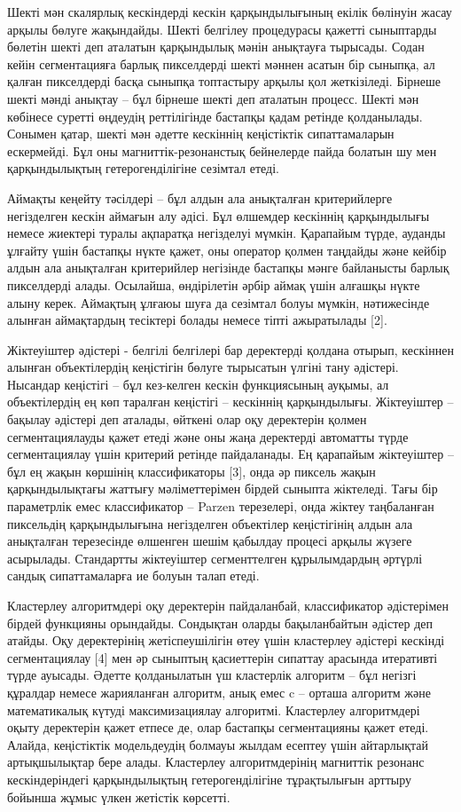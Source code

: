 Шекті мән скалярлық кескіндерді кескін қарқындылығының екілік бөлінуін
жасау арқылы бөлуге жақындайды. Шекті белгілеу процедурасы қажетті
сыныптарды бөлетін шекті деп аталатын қарқындылық мәнін анықтауға
тырысады. Содан кейін сегментацияға барлық пикселдерді шекті мәннен
асатын бір сыныпқа, ал қалған пикселдерді басқа сыныпқа топтастыру
арқылы қол жеткізіледі. Бірнеше шекті мәнді анықтау -- бұл бірнеше шекті
деп аталатын процесс. Шекті мән көбінесе суретті өңдеудің реттілігінде
бастапқы қадам ретінде қолданылады. Сонымен қатар, шекті мән әдетте
кескіннің кеңістіктік сипаттамаларын ескермейді. Бұл оны
магниттік-резонанстық бейнелерде пайда болатын шу мен қарқындылықтың
гетерогенділігіне сезімтал етеді.

Аймақты кеңейту тәсілдері -- бұл алдын ала анықталған критерийлерге
негізделген кескін аймағын алу әдісі. Бұл өлшемдер кескіннің
қарқындылығы немесе жиектері туралы ақпаратқа негізделуі мүмкін.
Қарапайым түрде, ауданды ұлғайту үшін бастапқы нүкте қажет, оны оператор
қолмен таңдайды және кейбір алдын ала анықталған критерийлер негізінде
бастапқы мәнге байланысты барлық пикселдерді алады. Осылайша,
өндірілетін әрбір аймақ үшін алғашқы нүкте алыну керек. Аймақтың ұлғаюы
шуға да сезімтал болуы мүмкін, нәтижесінде алынған аймақтардың тесіктері
болады немесе тіпті ажыратылады {[}2{]}.

Жіктеуіштер әдістері - белгілі белгілері бар деректерді қолдана отырып,
кескіннен алынған объектілердің кеңістігін бөлуге тырысатын үлгіні тану
әдістері. Нысандар кеңістігі -- бұл кез-келген кескін функциясының
ауқымы, ал объектілердің ең көп таралған кеңістігі -- кескіннің
қарқындылығы. Жіктеуіштер -- бақылау әдістері деп аталады, өйткені олар
оқу деректерін қолмен сегментациялауды қажет етеді және оны жаңа
деректерді автоматты түрде сегментациялау үшін критерий ретінде
пайдаланады. Ең қарапайым жіктеуіштер -- бұл ең жақын көршінің
классификаторы {[}3{]}, онда әр пиксель жақын қарқындылықтағы жаттығу
мәліметтерімен бірдей сыныпта жіктеледі. Тағы бір параметрлік емес
классификатор -- Parzen терезелері, онда жіктеу таңбаланған пиксельдің
қарқындылығына негізделген объектілер кеңістігінің алдын ала анықталған
терезесінде өлшенген шешім қабылдау процесі арқылы жүзеге асырылады.
Стандартты жіктеуіштер сегменттелген құрылымдардың әртүрлі сандық
сипаттамаларға ие болуын талап етеді.

Кластерлеу алгоритмдері оқу деректерін пайдаланбай, классификатор
әдістерімен бірдей функцияны орындайды. Сондықтан оларды бақыланбайтын
әдістер деп атайды. Оқу деректерінің жетіспеушілігін өтеу үшін
кластерлеу әдістері кескінді сегментациялау {[}4{]} мен әр сыныптың
қасиеттерін сипаттау арасында итеративті түрде ауысады. Әдетте
қолданылатын үш кластерлік алгоритм -- бұл негізгі құралдар немесе
жарияланған алгоритм, анық емес c -- орташа алгоритм және математикалық
күтуді максимизациялау алгоритмі. Кластерлеу алгоритмдері оқыту
деректерін қажет етпесе де, олар бастапқы сегментацияны қажет етеді.
Алайда, кеңістіктік модельдеудің болмауы жылдам есептеу үшін айтарлықтай
артықшылықтар бере алады. Кластерлеу алгоритмдерінің магниттік резонанс
кескіндеріндегі қарқындылықтың гетерогенділігіне тұрақтылығын арттыру
бойынша жұмыс үлкен жетістік көрсетті.

